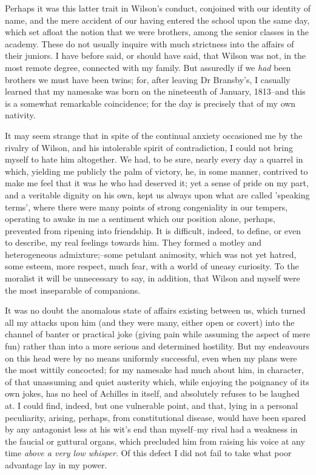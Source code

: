 \documentclass[12pt]{article}
\begin{document}
     Perhaps it was this latter trait in Wilson's conduct,
conjoined with our identity of name, and the mere accident of our
having entered the school upon the same day, which set afloat the
notion that we were brothers, among the senior classes in the
academy.  These do not usually inquire with much strictness into
the affairs of their juniors.  I have before said, or should have
said, that Wilson was not, in the most remote degree, connected
with my family.  But assuredly if we \emph{had} been brothers we must
have been twins; for, after leaving Dr Bransby's, I casually
learned that my namesake was born on the nineteenth of January,
1813--and this is a somewhat remarkable coincidence; for the day is
precisely that of my own nativity.

     It may seem strange that in spite of the continual anxiety
occasioned me by the rivalry of Wilson, and his intolerable spirit
of contradiction, I could not bring myself to hate him altogether. 
We had, to be sure, nearly every day a quarrel in which, yielding
me publicly the palm of victory, he, in some manner, contrived to
make me feel that it was he who had deserved it; yet a sense of
pride on my part, and a veritable dignity on his own, kept us
always upon what are called 'speaking terms', where there were 
 many points of strong congeniality in our tempers, operating to
awake in me a sentiment which our position alone, perhaps,
prevented from ripening into friendship.  It is difficult, indeed,
to define, or even to describe, my real feelings towards him.  They
formed a motley and heterogeneous admixture;--some petulant
animosity, which was not yet hatred, some esteem, more respect,
much fear, with a world of uneasy curiosity.  To the moralist it
will be unnecessary to say, in addition, that Wilson and myself
were the most inseparable of companions.

     It was no doubt the anomalous state of affairs existing
between us, which turned all my attacks upon him (and they were
many, either open or covert) into the channel of banter or
practical joke (giving pain while assuming the aspect of mere fun)
rather than into a more serious and determined hostility.  But my
endeavours on this head were by no means uniformly successful, even
when my plans were the most wittily concocted; for my namesake had
much about him, in character, of that unassuming and quiet
austerity which, while enjoying the poignancy of its own jokes, has
no heel of Achilles in itself, and absolutely refuses to be laughed
at.  I could find, indeed, but one vulnerable point, and that,
lying in a personal peculiarity, arising, perhaps, from
constitutional disease, would have been spared by any antagonist
less at his wit's end than myself--my rival had a weakness in the
faucial or guttural organs, which precluded him from raising his
voice at any time \emph{above a very low whisper}.  Of this defect I
did not fail to take what poor advantage lay in my power.
\end{document}
